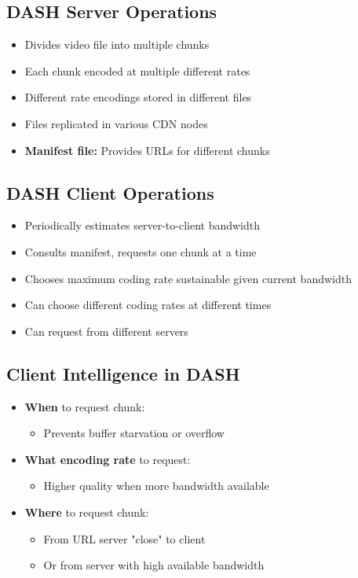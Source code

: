 \documentclass[12pt]{article}
\begin{document}
\subsection{DASH Server Operations}
\begin{itemize}
    \item Divides video file into multiple chunks
    \item Each chunk encoded at multiple different rates
    \item Different rate encodings stored in different files
    \item Files replicated in various CDN nodes
    \item \textbf{Manifest file:} Provides URLs for different chunks
\end{itemize}

\subsection{DASH Client Operations}
\begin{itemize}
    \item Periodically estimates server-to-client bandwidth
    \item Consults manifest, requests one chunk at a time
    \item Chooses maximum coding rate sustainable given current bandwidth
    \item Can choose different coding rates at different times
    \item Can request from different servers
\end{itemize}

\subsection{Client Intelligence in DASH}
\begin{itemize}
    \item \textbf{When} to request chunk:
          \begin{itemize}
              \item Prevents buffer starvation or overflow
          \end{itemize}

    \item \textbf{What encoding rate} to request:
          \begin{itemize}
              \item Higher quality when more bandwidth available
          \end{itemize}

    \item \textbf{Where} to request chunk:
          \begin{itemize}
              \item From URL server "close" to client
              \item Or from server with high available bandwidth
          \end{itemize}
\end{itemize}
\end{document}
